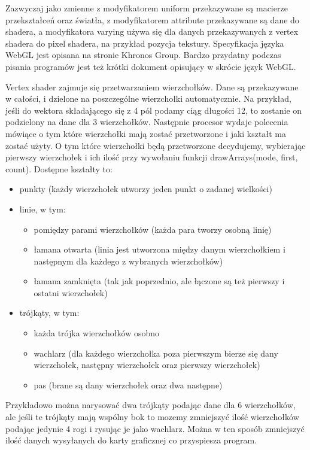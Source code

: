 Zazwyczaj jako zmienne z modyfikatorem uniform przekazywane są macierze przekształceń oraz \'swiatła, z modyfikatorem attribute przekazywane są dane do shadera, a modyfikatora varying używa się dla danych przekazywanych z vertex shadera do pixel shadera, na przykład pozycja tekstury. 
Specyfikacja języka WebGL jest opisana na stronie Khronos Group\cite{WebGLSpecification}. Bardzo przydatny podczas pisania programów jest też krótki dokument opisujący w skrócie język WebGL\cite{WebGLReferenceCard}.\newpage

\smallskip

Vertex shader zajmuje się przetwarzaniem wierzchołków. Dane są przekazywane w całości, i dzielone na poszczególne wierzchołki automatycznie. Na przykład, je\'sli do wektora składającego się z 4 pól podamy ciąg długości 12, to zostanie on podzielony na dane dla 3 wierzchołków.
Następnie procesor wydaje polecenia mówiące o tym które wierzchołki mają zostać przetworzone i jaki kształt ma zostać użyty. O tym które wierzchołki będą przetworzone decydujemy, wybierając pierwszy wierzchołek i ich ilo\'sć przy wywołaniu funkcji drawArrays(mode, first, count).
Dostępne kształty to:\begin{itemize}[topsep=0.2em, itemsep=0.5em, partopsep=0em, parsep=0em]
	\item punkty (każdy wierzchołek utworzy jeden punkt o zadanej wielko\'sci)
	\item linie, w tym:\begin{itemize}[topsep=0.2em, itemsep=0.5em, partopsep=0em, parsep=0em]
		\item pomiędzy parami wierzchołków (każda para tworzy osobną linię)
		\item łamana otwarta (linia jest utworzona między danym wierzchołkiem i następnym dla każdego z wybranych wierzchołków)
		\item łamana zamknięta (tak jak poprzednio, ale łączone są też pierwszy i ostatni wierzchołek)
	\end{itemize}
	\item trójkąty, w tym:\begin{itemize}[topsep=0.2em, itemsep=0.5em, partopsep=0em, parsep=0em]
		\item każda trójka wierzchołków osobno
		\item wachlarz (dla każdego wierzchołka poza pierwszym bierze się dany wierzchołek, następny wierzchołek oraz pierwszy wierzchołek)
		\item pas (brane są dany wierzchołek oraz dwa następne)
	\end{itemize}
\end{itemize}
Przykładowo można narysować dwa trójkąty podając dane dla 6 wierzchołków, ale jeśli te trójkąty mają wspólny bok to mozemy zmniejszyć ilość wierzchołków podając jedynie 4 rogi i rysując je jako wachlarz. Można w ten sposób zmniejszyć ilość danych wysyłanych do karty graficznej co przyspiesza program.


